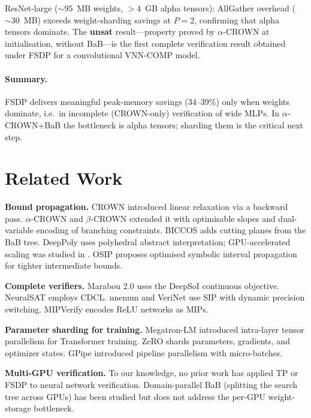 \documentclass[11pt]{article}
\begin{document}
ResNet-large (${\sim}95$~MB weights, $>4$~GB alpha tensors): AllGather overhead
(${\sim}30$~MB) exceeds weight-sharding savings at $P{=}2$, confirming that
alpha tensors dominate. The \textbf{unsat} result---property proved by
$\alpha$-CROWN at initialisation, without BaB---is the first complete
verification result obtained under FSDP for a convolutional VNN-COMP model.

\paragraph{Summary.}
FSDP delivers meaningful peak-memory savings (34--39\%) only when weights
dominate, i.e.\ in incomplete (CROWN-only) verification of wide MLPs. In
$\alpha$-CROWN+BaB the bottleneck is alpha tensors; sharding them is the
critical next step.

\section{Related Work}
\label{sec:related}

\textbf{Bound propagation.}
CROWN \citep{CROWNPaper} introduced linear relaxation via a backward pass.
$\alpha$-CROWN \citep{AlphaBetaCrownVNNCOMP23} and $\beta$-CROWN
\citep{betaCROWN2021} extended it with optimisable slopes and dual-variable
encoding of branching constraints. BICCOS \citep{NeurIPS2024BnbCuttingPlanes}
adds cutting planes from the BaB tree. DeepPoly \citep{DeepPolyAbstractDomain}
uses polyhedral abstract interpretation; GPU-accelerated scaling was studied
in \citep{ScalingPolyhedralGPU}. OSIP \citep{arXiv2212OSIP} proposes optimised
symbolic interval propagation for tighter intermediate bounds.

\textbf{Complete verifiers.} Marabou 2.0 \citep{arXiv2401Marabou2} uses the
DeepSoI continuous objective. NeuralSAT \citep{NeuralSATRepo} employs CDCL.
nnenum \citep{NNEnumPaper} and VeriNet use SIP with dynamic precision switching.
MIPVerify \citep{arXiv1711MIPRobustness} encodes ReLU networks as MIPs.

\textbf{Parameter sharding for training.}
Megatron-LM \citep{MegatronLM2020} introduced intra-layer tensor parallelism
for Transformer training. ZeRO \citep{ZeROPaper} shards parameters, gradients,
and optimizer states. GPipe \citep{GPipePaper} introduced pipeline parallelism
with micro-batches.

\textbf{Multi-GPU verification.}
To our knowledge, no prior work has applied TP or FSDP to neural network
verification. Domain-parallel BaB (splitting the search tree across GPUs) has
been studied but does not address the per-GPU weight-storage bottleneck.
\end{document}
